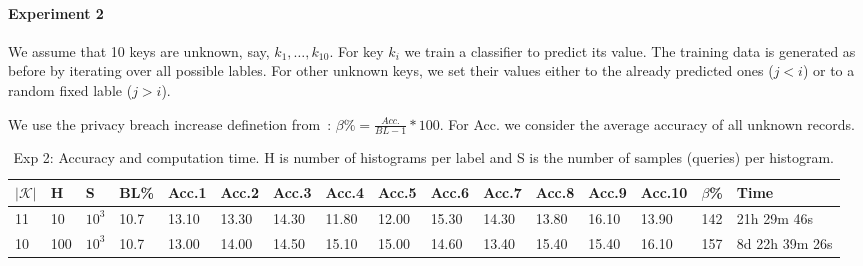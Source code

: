 \documentclass[a4paper,10pt]{article}
\newcommand{\calK}{\mathcal{K}}
\begin{document}
\paragraph{Experiment 2}
We assume that 10 keys are unknown, say, $k_1, \ldots, k_10$. 
For key $k_i$ we train a classifier to predict its value. The training data is generated as before by iterating over all possible lables. 
For other unknown keys, we set their values either to the already predicted ones ($j<i$) or to a random fixed lable ($j>i$).  

We use the privacy breach increase definetion from~\cite{DBLP:conf/icde/CormodePSSY13}: $\beta\% = \frac{Acc.}{BL-1}*100$. 
For Acc. we consider the average accuracy of all unknown records. 


\begin{table}[!h]
\centering
{\setlength\tabcolsep{2pt} %
\begin{tabular}{|l|l|l|l|l|l|l|l|l|l|l|l|l|l|l|l|} 
\hline 
\rowcolor{Gray} 
$|\calK|$     &  H  &  S      & BL\%   &  Acc.1  &  Acc.2  &  Acc.3  &  Acc.4 &  Acc.5  &  Acc.6  &  Acc.7  &  Acc.8  &  Acc.9 &  Acc.10  & $\beta$\%  & Time          \\ \hline  
11            &  10 &  $10^3$ & 10.7   &  13.10  &  13.30  &  14.30  & 11.80  &  12.00  &  15.30  &  14.30  &  13.80  & 16.10  &  13.90   & 142        &  21h 29m 46s     \\ \hline  %
10            & 100 &  $10^3$ & 10.7   &  13.00  &  14.00  & 14.50   &  15.10  & 15.00  &  14.60  &  13.40  &  15.40  &  15.40  & 16.10   & 157        &  8d 22h 39m 26s   \\ \hline %
\end{tabular} 
}
\label{tab:acc}
\caption{Exp 2: Accuracy and computation time. H is number of histograms per label and S is the number of samples (queries) per histogram.} 
\end{table}


 
\end{document}
